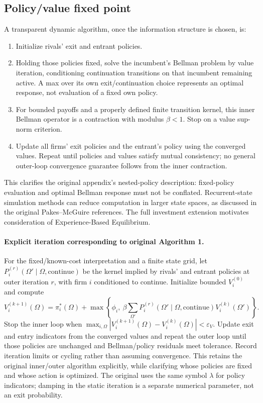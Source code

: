\documentclass[11pt]{article}
\begin{document}
\subsection*{Policy/value fixed point}
A transparent dynamic algorithm, once the information structure is chosen, is:
\begin{enumerate}
\item Initialize rivals' exit and entrant policies.
\item Holding those policies fixed, solve the incumbent's Bellman problem by value iteration, conditioning continuation transitions on that incumbent remaining active. A max over its own exit/continuation choice represents an optimal response, not evaluation of a fixed own policy.
\item For bounded payoffs and a properly defined finite transition kernel, this inner Bellman operator is a contraction with modulus $\beta<1$. Stop on a value sup-norm criterion.
\item Update all firms' exit policies and the entrant's policy using the converged values. Repeat until policies and values satisfy mutual consistency; no general outer-loop convergence guarantee follows from the inner contraction.
\end{enumerate}
This clarifies the original appendix's nested-policy description: fixed-policy evaluation and optimal Bellman response must not be conflated. Recurrent-state simulation methods can reduce computation in larger state spaces, as discussed in the original Pakes--McGuire references. The full investment extension motivates consideration of Experience-Based Equilibrium.

\paragraph{Explicit iteration corresponding to original Algorithm 1.} For the fixed/known-cost interpretation and a finite state grid, let $P_i^{(r)}(\Omega'\mid\Omega,\mathrm{continue})$ be the kernel implied by rivals' and entrant policies at outer iteration $r$, with firm $i$ conditioned to continue. Initialize bounded $V_i^{(0)}$ and compute
\[
V_i^{(k+1)}(\Omega)=\pi_i^*(\Omega)+
\max\left\{\phi_i,\ \beta\sum_{\Omega'}P_i^{(r)}(\Omega'\mid\Omega,\mathrm{continue})V_i^{(k)}(\Omega')\right\}.
\]
Stop the inner loop when $\max_{i,\Omega}|V_i^{(k+1)}(\Omega)-V_i^{(k)}(\Omega)|<\varepsilon_V$. Update exit and entry indicators from the converged values and repeat the outer loop until those policies are unchanged and Bellman/policy residuals meet tolerance. Record iteration limits or cycling rather than assuming convergence. This retains the original inner/outer algorithm explicitly, while clarifying whose policies are fixed and whose action is optimized. The original uses the same symbol $\lambda$ for policy indicators; damping in the static iteration is a separate numerical parameter, not an exit probability.
\end{document}
